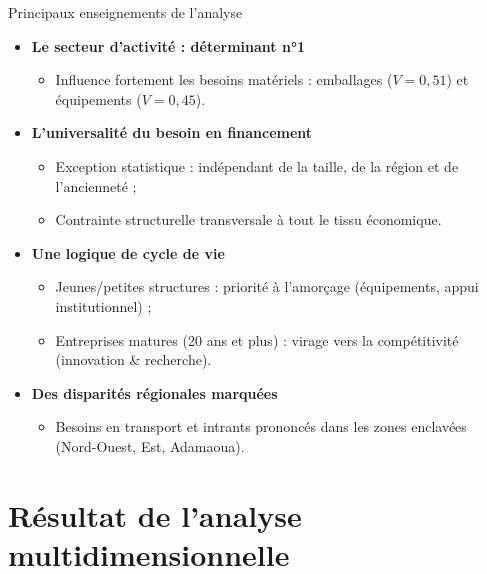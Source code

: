 \documentclass[aspectratio=169, 10pt]{beamer}
\begin{document}
\begin{frame}{Principaux enseignements de l'analyse}
    \begin{itemize}
        \item \textbf{Le secteur d'activité : déterminant n°1}
        \begin{itemize}
            \item Influence fortement les besoins matériels : emballages ($V=0,51$) et équipements ($V=0,45$).
        \end{itemize}
        \vfill
        \item \textbf{L'universalité du besoin en financement}
        \begin{itemize}
            \item \alert{Exception statistique} : indépendant de la taille, de la région et de l'ancienneté ;
            \item Contrainte structurelle transversale à tout le tissu économique.
        \end{itemize}
        \vfill
        \item \textbf{Une logique de cycle de vie}
        \begin{itemize}
            \item Jeunes/petites structures : priorité à l'amorçage (équipements, appui institutionnel) ;
            \item Entreprises matures (20 ans et plus) : virage vers la compétitivité (innovation \& recherche).
        \end{itemize}
        \vfill
        \item \textbf{Des disparités régionales marquées}
        \begin{itemize}
            \item Besoins en transport et intrants prononcés dans les zones enclavées (Nord-Ouest, Est, Adamaoua).
        \end{itemize}
    \end{itemize}
\end{frame}

\section{Résultat de l'analyse multidimensionnelle}
\end{document}
